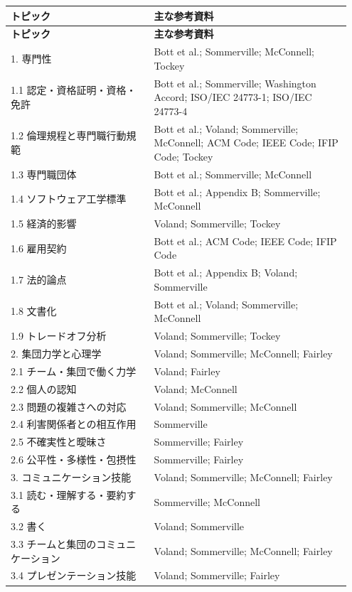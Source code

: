 \documentclass[uplatex,dvipdfmx,a4paper,11pt]{jsarticle}
\begin{document}
\begin{center}
\small
\begin{longtable}{p{0.40\linewidth}p{0.55\linewidth}}
\toprule
\textbf{トピック} & \textbf{主な参考資料} \\
\midrule
\endfirsthead
\toprule
\textbf{トピック} & \textbf{主な参考資料} \\
\midrule
\endhead
1. 専門性 & Bott et al.; Sommerville; McConnell; Tockey \\
\midrule
1.1 認定・資格証明・資格・免許 & Bott et al.; Sommerville; Washington Accord; ISO/IEC 24773-1; ISO/IEC 24773-4 \\
\midrule
1.2 倫理規程と専門職行動規範 & Bott et al.; Voland; Sommerville; McConnell; ACM Code; IEEE Code; IFIP Code; Tockey \\
\midrule
1.3 専門職団体 & Bott et al.; Sommerville; McConnell \\
\midrule
1.4 ソフトウェア工学標準 & Bott et al.; Appendix B; Sommerville; McConnell \\
\midrule
1.5 経済的影響 & Voland; Sommerville; Tockey \\
\midrule
1.6 雇用契約 & Bott et al.; ACM Code; IEEE Code; IFIP Code \\
\midrule
1.7 法的論点 & Bott et al.; Appendix B; Voland; Sommerville \\
\midrule
1.8 文書化 & Bott et al.; Voland; Sommerville; McConnell \\
\midrule
1.9 トレードオフ分析 & Voland; Sommerville; Tockey \\
\midrule
2. 集団力学と心理学 & Voland; Sommerville; McConnell; Fairley \\
\midrule
2.1 チーム・集団で働く力学 & Voland; Fairley \\
\midrule
2.2 個人の認知 & Voland; McConnell \\
\midrule
2.3 問題の複雑さへの対応 & Voland; Sommerville; McConnell \\
\midrule
2.4 利害関係者との相互作用 & Sommerville \\
\midrule
2.5 不確実性と曖昧さ & Sommerville; Fairley \\
\midrule
2.6 公平性・多様性・包摂性 & Sommerville; Fairley \\
\midrule
3. コミュニケーション技能 & Voland; Sommerville; McConnell; Fairley \\
\midrule
3.1 読む・理解する・要約する & Sommerville; McConnell \\
\midrule
3.2 書く & Voland; Sommerville \\
\midrule
3.3 チームと集団のコミュニケーション & Voland; Sommerville; McConnell; Fairley \\
\midrule
3.4 プレゼンテーション技能 & Voland; Sommerville; Fairley \\
\midrule
\bottomrule
\end{longtable}
\normalsize
\end{center}
\end{document}
